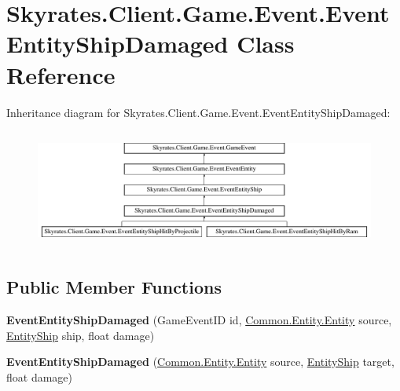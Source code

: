 \hypertarget{class_skyrates_1_1_client_1_1_game_1_1_event_1_1_event_entity_ship_damaged}{\section{Skyrates.\-Client.\-Game.\-Event.\-Event\-Entity\-Ship\-Damaged Class Reference}
\label{class_skyrates_1_1_client_1_1_game_1_1_event_1_1_event_entity_ship_damaged}
}
Inheritance diagram for Skyrates.\-Client.\-Game.\-Event.\-Event\-Entity\-Ship\-Damaged\-:\begin{figure}[H]
\begin{center}
\leavevmode
\includegraphics[height=3.977273cm]{class_skyrates_1_1_client_1_1_game_1_1_event_1_1_event_entity_ship_damaged}
\end{center}
\end{figure}
\subsection*{Public Member Functions}
\begin{DoxyCompactItemize}
\item 
\hypertarget{class_skyrates_1_1_client_1_1_game_1_1_event_1_1_event_entity_ship_damaged_a18f90ff076ba51a0167f4aac10a225cb}{{\bfseries Event\-Entity\-Ship\-Damaged} (Game\-Event\-I\-D id, \hyperlink{class_skyrates_1_1_common_1_1_entity_1_1_entity}{Common.\-Entity.\-Entity} source, \hyperlink{class_skyrates_1_1_client_1_1_entity_1_1_entity_ship}{Entity\-Ship} ship, float damage)}\label{class_skyrates_1_1_client_1_1_game_1_1_event_1_1_event_entity_ship_damaged_a18f90ff076ba51a0167f4aac10a225cb}

\item 
\hypertarget{class_skyrates_1_1_client_1_1_game_1_1_event_1_1_event_entity_ship_damaged_a4e157052f0469f3f334d7585bf9023e7}{{\bfseries Event\-Entity\-Ship\-Damaged} (\hyperlink{class_skyrates_1_1_common_1_1_entity_1_1_entity}{Common.\-Entity.\-Entity} source, \hyperlink{class_skyrates_1_1_client_1_1_entity_1_1_entity_ship}{Entity\-Ship} target, float damage)}\label{class_skyrates_1_1_client_1_1_game_1_1_event_1_1_event_entity_ship_damaged_a4e157052f0469f3f334d7585bf9023e7}

\end{DoxyCompactItemize}
